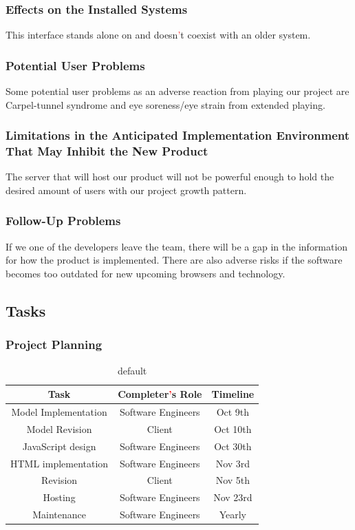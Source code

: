 \documentclass[11pt, oneside]{article}   	%
\begin{document}
\subsubsection{Effects on the Installed Systems}
This interface stands alone on and doesn\textcolor{red}{'}t coexist with an older system.


\subsubsection{Potential User Problems}
Some potential user problems as an adverse reaction from playing our project are Carpel-tunnel syndrome and eye soreness/eye strain from extended playing.


\subsubsection{Limitations in the Anticipated Implementation Environment That May Inhibit the New Product}
The server that will host our product will not be powerful enough to hold the desired amount of users with our project growth pattern.


\subsubsection{Follow-Up Problems}
If we one of the developers leave the team, there will be a gap in the information for how the product is implemented. There are also adverse risks if the software becomes too outdated for new upcoming browsers and technology.


\subsection{Tasks}
\subsubsection{Project Planning}
\begin{table}[H]
\caption{default}
\begin{center}
\begin{tabular}{|c|c|c|}
\hline
Task	& Completer\textcolor{red}{'}s Role & Timeline\\
\hline
Model Implementation & Software Engineers & Oct 9th\\
\hline
Model Revision	& Client & Oct 10th\\
\hline
JavaScript design & Software Engineers & Oct 30th\\
\hline
HTML implementation & Software Engineers & Nov 3rd\\
\hline
Revision & Client & Nov 5th\\
\hline
Hosting & Software Engineers & Nov 23rd\\
\hline
Maintenance & Software Engineers & Yearly\\
\hline
\end{tabular}
\end{center}
\label{default}
\end{table}%
\end{document}
